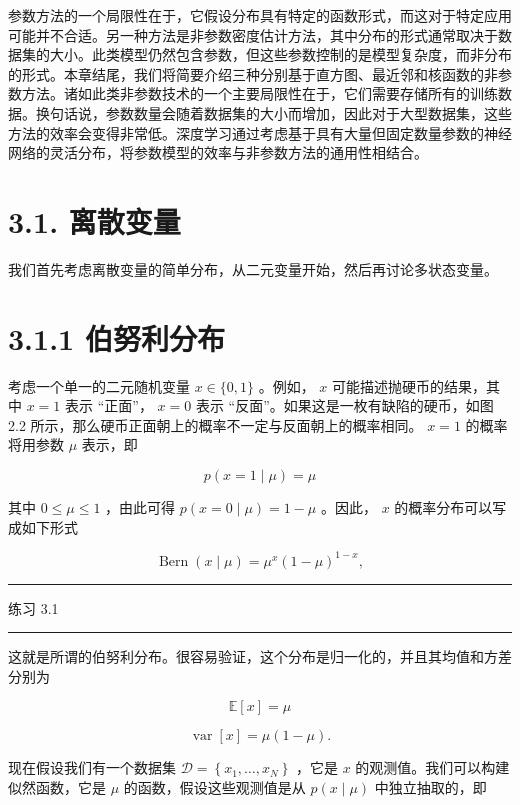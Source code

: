 \documentclass[10pt]{article}
\newcommand{\HRule}{\begin{center}\rule{0.9\linewidth}{0.2mm}\end{center}}
\begin{document}
参数方法的一个局限性在于，它假设分布具有特定的函数形式，而这对于特定应用可能并不合适。另一种方法是非参数密度估计方法，其中分布的形式通常取决于数据集的大小。此类模型仍然包含参数，但这些参数控制的是模型复杂度，而非分布的形式。本章结尾，我们将简要介绍三种分别基于直方图、最近邻和核函数的非参数方法。诸如此类非参数技术的一个主要局限性在于，它们需要存储所有的训练数据。换句话说，参数数量会随着数据集的大小而增加，因此对于大型数据集，这些方法的效率会变得非常低。深度学习通过考虑基于具有大量但固定数量参数的神经网络的灵活分布，将参数模型的效率与非参数方法的通用性相结合。

\section*{3.1. 离散变量}

我们首先考虑离散变量的简单分布，从二元变量开始，然后再讨论多状态变量。

\section*{3.1.1 伯努利分布}

考虑一个单一的二元随机变量 \(x \in  \{ 0,1\}\) 。例如， \(x\) 可能描述抛硬币的结果，其中 \(x = 1\) 表示 “正面”， \(x = 0\) 表示 “反面”。如果这是一枚有缺陷的硬币，如图 2.2 所示，那么硬币正面朝上的概率不一定与反面朝上的概率相同。 \(x = 1\) 的概率将用参数 \(\mu\) 表示，即

\[
p\left( {x = 1 \mid  \mu }\right)  = \mu  \tag{3.1}
\]

其中 \(0 \leq  \mu  \leq  1\) ，由此可得 \(p\left( {x = 0 \mid  \mu }\right)  = 1 - \mu\) 。因此， \(x\) 的概率分布可以写成如下形式

\[
\operatorname{Bern}\left( {x \mid  \mu }\right)  = {\mu }^{x}{\left( 1 - \mu \right) }^{1 - x}, \tag{3.2}
\]

\HRule

练习 3.1

\HRule

这就是所谓的伯努利分布。很容易验证，这个分布是归一化的，并且其均值和方差分别为

\[
\mathbb{E}\left\lbrack  x\right\rbrack   = \mu  \tag{3.3}
\]

\[
\operatorname{var}\left\lbrack  x\right\rbrack   = \mu \left( {1 - \mu }\right) . \tag{3.4}
\]

现在假设我们有一个数据集 \(\mathcal{D} = \left\{  {{x}_{1},\ldots ,{x}_{N}}\right\}\) ，它是 \(x\) 的观测值。我们可以构建似然函数，它是 \(\mu\) 的函数，假设这些观测值是从 \(p\left( {x \mid  \mu }\right)\) 中独立抽取的，即
\end{document}
